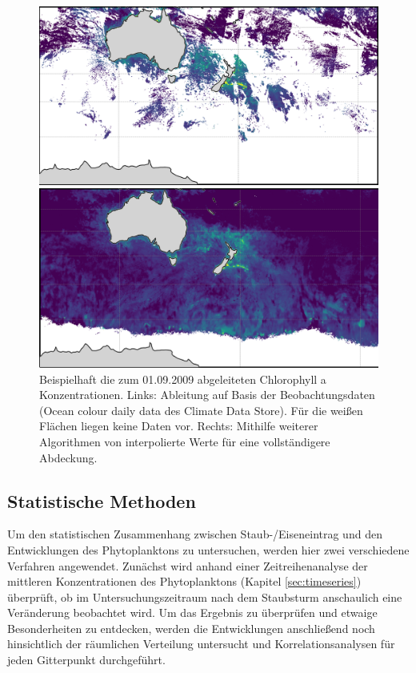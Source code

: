 \documentclass[12pt,a4paper,onecolumn,headheight=30pt]{scrartcl}
\begin{document}
\begin{figure}[htbp]
	\begin{minipage}[c]{0.49\textwidth}
		\includegraphics[width=\textwidth]{bilder/chla_raw.png}
	\end{minipage}\hfill
	\begin{minipage}[c]{0.49\textwidth}
		 \includegraphics[width=\textwidth]{bilder/chla_interpol.png}
	\end{minipage}\hfill
	\caption{Beispielhaft die zum 01.09.2009 abgeleiteten Chlorophyll a Konzentrationen. Links: Ableitung auf Basis der Beobachtungsdaten (Ocean colour daily data des Climate Data Store). Für die weißen Flächen liegen keine Daten vor. Rechts: Mithilfe weiterer Algorithmen von \citet{Saulquin.2019} interpolierte Werte für eine vollständigere Abdeckung.} \label{fig:chla}
\end{figure}
\subsection{Statistische Methoden} \label{sec:stats}
Um den statistischen Zusammenhang zwischen Staub-/Eiseneintrag und den Entwicklungen des Phytoplanktons zu untersuchen, werden hier zwei verschiedene Verfahren angewendet. Zunächst wird anhand einer Zeitreihenanalyse der mittleren Konzentrationen des Phytoplanktons (Kapitel \ref{sec:timeseries}) überprüft, ob im Untersuchungszeitraum nach dem Staubsturm  anschaulich eine Veränderung beobachtet wird. Um das Ergebnis zu überprüfen und etwaige Besonderheiten zu entdecken, werden die Entwicklungen anschließend noch hinsichtlich der räumlichen Verteilung untersucht und Korrelationsanalysen für jeden Gitterpunkt durchgeführt.
\end{document}
